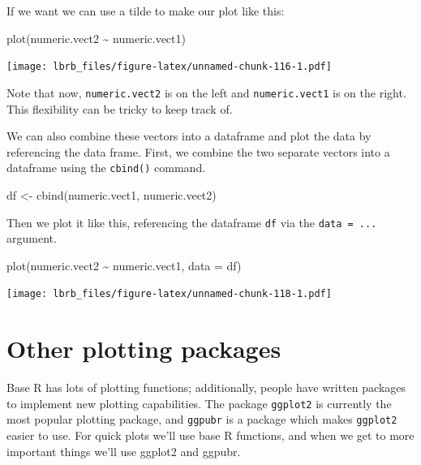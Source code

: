 \documentclass[
]{book}
\newenvironment{Shaded}{\begin{snugshade}}{\end{snugshade}}
\newcommand{\AttributeTok}[1]{\textcolor[rgb]{0.77,0.63,0.00}{#1}}
\newcommand{\FunctionTok}[1]{\textcolor[rgb]{0.00,0.00,0.00}{#1}}
\newcommand{\NormalTok}[1]{#1}
\newcommand{\OtherTok}[1]{\textcolor[rgb]{0.56,0.35,0.01}{#1}}
\newcommand{\SpecialCharTok}[1]{\textcolor[rgb]{0.00,0.00,0.00}{#1}}
\begin{document}
If we want we can use a tilde to make our plot like this:

\begin{Shaded}
\begin{Highlighting}[]
\FunctionTok{plot}\NormalTok{(numeric.vect2 }\SpecialCharTok{\textasciitilde{}}\NormalTok{ numeric.vect1)}
\end{Highlighting}
\end{Shaded}

\texttt{[image: lbrb\_files/figure-latex/unnamed-chunk-116-1.pdf]}

Note that now, \texttt{numeric.vect2} is on the left and \texttt{numeric.vect1} is on the right. This flexibility can be tricky to keep track of.

We can also combine these vectors into a dataframe and plot the data by referencing the data frame. First, we combine the two separate vectors into a dataframe using the \texttt{cbind()} command.

\begin{Shaded}
\begin{Highlighting}[]
\NormalTok{df }\OtherTok{\textless{}{-}} \FunctionTok{cbind}\NormalTok{(numeric.vect1, numeric.vect2)}
\end{Highlighting}
\end{Shaded}

Then we plot it like this, referencing the dataframe \texttt{df} via the \texttt{data\ =\ ...} argument.

\begin{Shaded}
\begin{Highlighting}[]
\FunctionTok{plot}\NormalTok{(numeric.vect2 }\SpecialCharTok{\textasciitilde{}}\NormalTok{ numeric.vect1, }\AttributeTok{data =}\NormalTok{ df)}
\end{Highlighting}
\end{Shaded}

\texttt{[image: lbrb\_files/figure-latex/unnamed-chunk-118-1.pdf]}

\hypertarget{other-plotting-packages}{%
\section{Other plotting packages}\label{other-plotting-packages}}

Base R has lots of plotting functions; additionally, people have written packages to implement new plotting capabilities. The package \texttt{ggplot2} is currently the most popular plotting package, and \texttt{ggpubr} is a package which makes \texttt{ggplot2} easier to use. For quick plots we'll use base R functions, and when we get to more important things we'll use ggplot2 and ggpubr.
\end{document}
